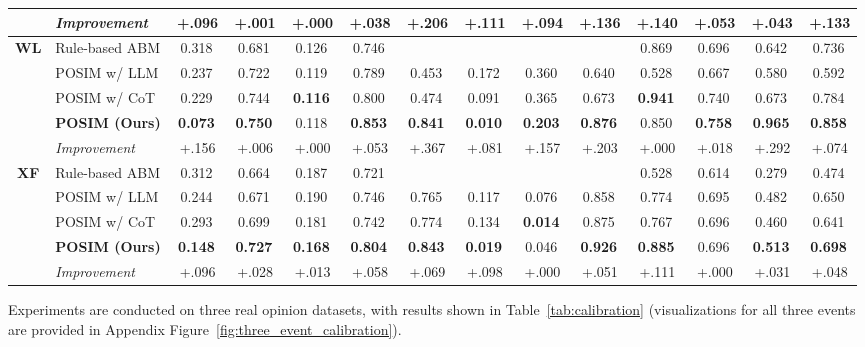 \documentclass[a4paper,fleqn]{cas-dc}
\newcommand{\best}[1]{\textbf{#1}}
\newcommand{\na}{\text{---}}
\newcommand{\gain}[1]{{\textcolor{gaingreen}{\,#1}}}
\begin{document}
\begin{table}[!t]
{\begin{tabular}{@{}cl cccc cccc cccc@{}}
\rowcolor{oursrow}
& \textit{Improvement} & \gain{+.096} & \gain{+.001} & \gain{+.000} & \gain{+.038} & \gain{+.206} & \gain{+.111} & \gain{+.094} & \gain{+.136} & \gain{+.140} & \gain{+.053} & \gain{+.043} & \gain{+.133} \\
\midrule
\multirow{5}{*}{\textbf{WL}}
& Rule-based ABM        & 0.318 & 0.681 & 0.126 & 0.746 & \na & \na & \na & \na & 0.869 & 0.696 & 0.642 & 0.736 \\
& POSIM w/ LLM        & 0.237 & 0.722 & 0.119 & 0.789 & 0.453 & 0.172 & 0.360 & 0.640 & 0.528 & 0.667 & 0.580 & 0.592 \\
& POSIM w/ CoT          & 0.229 & 0.744 & \best{0.116} & 0.800 & 0.474 & 0.091 & 0.365 & 0.673 & \best{0.941} & 0.740 & 0.673 & 0.784 \\
\rowcolor{oursrow}
& \textbf{POSIM (Ours)}  & \best{0.073} & \best{0.750} & 0.118 & \best{0.853} & \best{0.841} & \best{0.010} & \best{0.203} & \best{0.876} & 0.850 & \best{0.758} & \best{0.965} & \best{0.858} \\[1pt]
\rowcolor{oursrow}
& \textit{Improvement} & \gain{+.156} & \gain{+.006} & \gain{+.000} & \gain{+.053} & \gain{+.367} & \gain{+.081} & \gain{+.157} & \gain{+.203} & \gain{+.000} & \gain{+.018} & \gain{+.292} & \gain{+.074} \\
\midrule
\multirow{5}{*}{\textbf{XF}}
& Rule-based ABM        & 0.312 & 0.664 & 0.187 & 0.721 & \na & \na & \na & \na & 0.528 & 0.614 & 0.279 & 0.474 \\
& POSIM w/ LLM        & 0.244 & 0.671 & 0.190 & 0.746 & 0.765 & 0.117 & 0.076 & 0.858 & 0.774 & 0.695 & 0.482 & 0.650 \\
& POSIM w/ CoT          & 0.293 & 0.699 & 0.181 & 0.742 & 0.774 & 0.134 & \best{0.014} & 0.875 & 0.767 & 0.696 & 0.460 & 0.641 \\
\rowcolor{oursrow}
& \textbf{POSIM (Ours)}  & \best{0.148} & \best{0.727} & \best{0.168} & \best{0.804} & \best{0.843} & \best{0.019} & 0.046 & \best{0.926} & \best{0.885} & 0.696 & \best{0.513} & \best{0.698} \\[1pt]
\rowcolor{oursrow}
& \textit{Improvement} & \gain{+.096} & \gain{+.028} & \gain{+.013} & \gain{+.058} & \gain{+.069} & \gain{+.098} & \gain{+.000} & \gain{+.051} & \gain{+.111} & \gain{+.000} & \gain{+.031} & \gain{+.048} \\
\bottomrule
\end{tabular}%
}
\end{table}

Experiments are conducted on three real opinion datasets, with results shown in Table~\ref{tab:calibration} (visualizations for all three events are provided in Appendix Figure~\ref{fig:three_event_calibration}).
\end{document}
